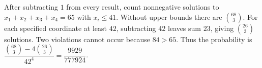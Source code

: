 After subtracting $1$ from every result, count nonnegative solutions to $x_1+x_2+x_3+x_4=65$ with $x_i\le41$. Without upper bounds there are $\binom{68}{3}$. For each specified coordinate at least $42$, subtracting $42$ leaves sum $23$, giving $\binom{26}{3}$ solutions. Two violations cannot occur because $84>65$. Thus the probability is $\dfrac{\binom{68}{3}-4\binom{26}{3}}{42^4}=\boxed{\dfrac{9929}{777924}}$.
